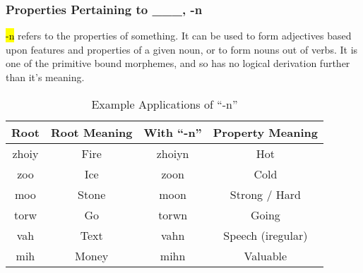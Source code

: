 \documentclass{article}
\newcommand{\hlv}[2][gray]{ {\sethlcolor{#1} \hl{#2}} }
\begin{document}
\subsubsection{Properties Pertaining to \_\_\_, -n}
\hlv{-n} refers to the properties of something. It can be used to form adjectives based upon
features and properties of a given noun, or to form nouns out of verbs. It is one of the primitive
bound morphemes, and so has no logical derivation further than it's meaning.

\begin{table}[H]
    \centering
    \begin{tabular}{c|c||c|c}
        Root & Root Meaning & With ``-n'' & Property Meaning \\
        \hline
        zhoiy & Fire & zhoiyn & Hot \\
        zoo & Ice & zoon & Cold \\
        moo & Stone & moon & Strong / Hard \\
        torw & Go & torwn & Going \\
        vah & Text & vahn & Speech (iregular) \\
        mih & Money & mihn & Valuable
    \end{tabular}
    \caption{Example Applications of ``-n''}
    \label{Example Applications of ``-n''}
\end{table}
\end{document}
